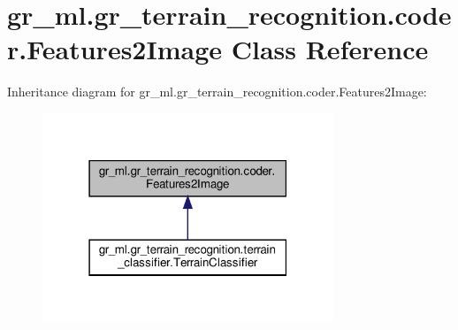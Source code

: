 \hypertarget{classgr__ml_1_1gr__terrain__recognition_1_1coder_1_1Features2Image}{}\section{gr\+\_\+ml.\+gr\+\_\+terrain\+\_\+recognition.\+coder.\+Features2\+Image Class Reference}
\label{classgr__ml_1_1gr__terrain__recognition_1_1coder_1_1Features2Image}


Inheritance diagram for gr\+\_\+ml.\+gr\+\_\+terrain\+\_\+recognition.\+coder.\+Features2\+Image\+:
\nopagebreak
\begin{figure}[H]
\begin{center}
\leavevmode
\includegraphics[width=247pt]{classgr__ml_1_1gr__terrain__recognition_1_1coder_1_1Features2Image__inherit__graph}
\end{center}
\end{figure}
